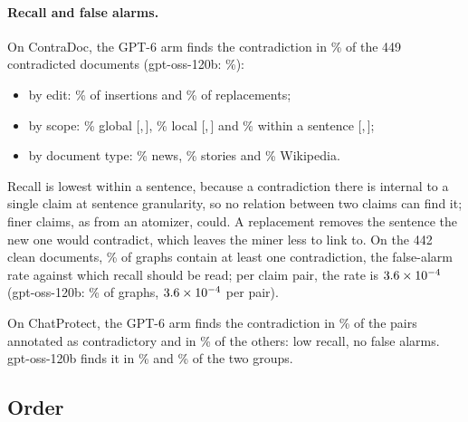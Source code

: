 \paragraph{Recall and false alarms.} On ContraDoc, the GPT-6 arm finds the contradiction in \extCdRecallGpt\% of the 449
contradicted documents (gpt-oss-120b: \extCdRecallOss\%):
\begin{itemize}[leftmargin=1.2em,itemsep=1pt,topsep=2pt]
\item by edit: \extCdRecallInsertGpt\% of insertions and \extCdRecallReplaceGpt\% of
  replacements;
\item by scope: \extCdRecallGlobalGpt\% global
  {\scriptsize[\extCdRecallGlobalGptLo,\,\extCdRecallGlobalGptHi]}, \extCdRecallLocalGpt\% local
  {\scriptsize[\extCdRecallLocalGptLo,\,\extCdRecallLocalGptHi]} and \extCdRecallIntraGpt\%
  within a sentence {\scriptsize[\extCdRecallIntraGptLo,\,\extCdRecallIntraGptHi]};
\item by document type: \extCdRecallNewsGpt\% news, \extCdRecallStoryGpt\% stories and
  \extCdRecallWikiGpt\% Wikipedia.
\end{itemize}
Recall is lowest within a sentence, because a contradiction there is internal to a single claim at sentence granularity, so no
relation between two claims can find it; finer claims, as from an atomizer, could. A replacement
removes the sentence the new one would contradict, which leaves the miner less to link to. On the
442 clean documents, \extCdFpGpt\% of graphs contain at least one contradiction, the false-alarm
rate against which recall should be read; per claim pair, the rate is $3.6\times10^{-4}$
(gpt-oss-120b: \extCdFpOss\% of graphs, $3.6\times10^{-4}$ per pair).

On ChatProtect, the GPT-6 arm finds the contradiction in \extCpConfStrongGpt\% of the pairs annotated as
contradictory and in \extCpConfNoneGpt\% of the others: low recall, no false alarms.
gpt-oss-120b finds it in \extCpConfStrongOss\% and \extCpConfNoneOss\% of the two groups.

\subsection{Order}
\label{app:ext-order}

